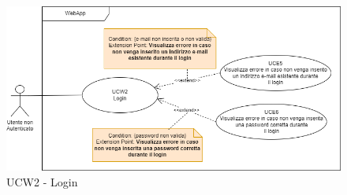 \begin{figure}[!h]
\centering
\includegraphics[scale=0.5]{UC_images/UCW2.png}
\caption{UCW2 - Login}
\end{figure}

